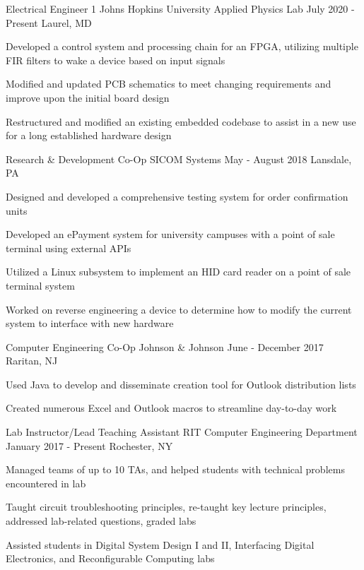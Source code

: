 
\begin{cvexperiences}

	\cvexperience
		{Electrical Engineer 1}
		{Johns Hopkins University Applied Physics Lab}
		{July 2020 - Present}
		{Laurel, MD}
		{
			\begin{cvitems}
			\item {Developed a control system and processing chain for an FPGA, utilizing multiple FIR filters to wake a device based on input signals}
			\item {Modified and updated PCB schematics to meet changing requirements and improve upon the initial board design}
			\item {Restructured and modified an existing embedded codebase to assist in a new use for a long established hardware design}
			\end{cvitems}
		}

	\cvexperience
		{Research \& Development Co-Op}
		{SICOM Systems}
		{May - August 2018}
		{Lansdale, PA}
		{
			\begin{cvitems}
			\item {Designed and developed a comprehensive testing system for order confirmation units}
			\item {Developed an ePayment system for university campuses with a point of sale terminal using external APIs}
			\item {Utilized a Linux subsystem to implement an HID card reader on a point of sale terminal system}
			\item {Worked on reverse engineering a device to determine how to modify the current system to interface with new hardware}
			\end{cvitems}
		}

	\cvexperience
		{Computer Engineering Co-Op}
		{Johnson \& Johnson}
		{June - December 2017}
		{Raritan, NJ}
		{
			\begin{cvitems}
			\item {Used Java to develop and disseminate creation tool for Outlook distribution lists}
			\item {Created numerous Excel and Outlook macros to streamline day-to-day work}
			\end{cvitems}
		}

	\cvexperience
		{Lab Instructor/Lead Teaching Assistant}
		{RIT Computer Engineering Department}
		{January 2017 - Present}
		{Rochester, NY}
		{
			\begin{cvitems}
			\item{Managed teams of up to 10 TAs, and helped students with technical problems encountered in lab}
			\item{Taught circuit troubleshooting principles, re-taught key lecture principles, addressed lab-related questions, graded labs}
			\item{Assisted students in Digital System Design I and II, Interfacing Digital Electronics, and Reconfigurable Computing labs}
			\end{cvitems}
		}


\end{cvexperiences}
